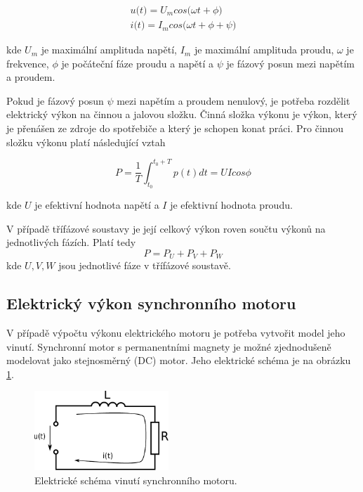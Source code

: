 \begin{equation}
\begin{split}
u\big(t\big) = U_m cos\big(\omega t + \phi\big) \\
i\big(t\big) = I_m cos\big(\omega t + \phi + \psi\big)
\end{split}
\label{harm_curr_volt_eq}
\end{equation}  

kde $U_m$ je maximální amplituda napětí, $I_m$ je maximální amplituda proudu, $\omega$ je frekvence, $\phi$ je počáteční fáze proudu a napětí a $\psi$ je fázový posun mezi napětím a proudem.

Pokud je fázový posun $\psi$ mezi napětím a proudem nenulový, je potřeba rozdělit elektrický výkon na činnou a jalovou složku. Činná složka výkonu je výkon, který je přenášen ze zdroje do spotřebiče a který je schopen konat práci. Pro činnou složku výkonu platí následující vztah

\begin{equation}
P = \frac{1}{T} \int_{t_0}^{t_0 + T} p(t)dt = UI cos\phi
\label{act_power_eq}
\end{equation}  

kde $U$ je efektivní hodnota napětí a $I$ je efektivní hodnota proudu.

V případě třífázové soustavy je její celkový výkon roven součtu výkonů na jednotlivých fázích. Platí tedy
\begin{equation}
P = P_U + P_V + P_W
\label{3ph_power_eq}
\end{equation}  
kde $U,V,W$ jsou jednotlivé fáze v třífázové soustavě.

\subsection{Elektrický výkon synchronního motoru}

V případě výpočtu výkonu elektrického motoru je potřeba vytvořit model jeho vinutí. Synchronní motor s permanentními magnety je možné zjednodušeně modelovat jako stejnosměrný (DC) motor. Jeho elektrické schéma je na obrázku \ref{schema_motoru_pic}.  

\begin{figure}[ht]
\includegraphics[width=0.45\textwidth]{obvod_motoru}
\caption{Elektrické schéma vinutí synchronního motoru.}
\label{schema_motoru_pic}
\end{figure}

